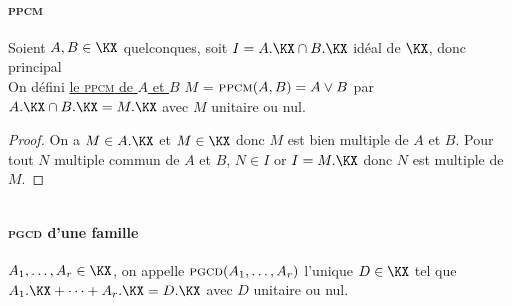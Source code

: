 		\paragraph{\textsc{ppcm}}
			Soient $A,B\in\KX$ quelconques, soit $I=A.\KX \cap B.\KX $ idéal de $\KX$, donc principal \\ 
			On défini \uline{le \textsc{ppcm} de $A$ et $B$} $M$ = $\textsc{ppcm}(A,B)=A\vee B$ par \\
			\hspace*{2cm} $A.\KX \cap B.\KX = M.\KX$ avec $M$ unitaire ou nul. \trait
		\begin{proof}
		On a $M\in A.\KX$ et $M\in\KX$ donc $M$ est bien multiple de $A$ et $B$. Pour tout $N$ multiple commun de $A$ et $B$, $N\in I$ or $I=M.\KX$ donc $N$ est multiple de $M$.
		\end{proof} ${}$ \traitd
		\paragraph{\textsc{pgcd} d'une famille}
			$A_1,\dots ,A_r \in\KX$, on appelle $\textsc{pgcd}(A_1,\dots , A_r)$ l'unique $D\in\KX$ tel que $A_1.\KX + \cdots + A_r.\KX = D.\KX$ avec $D$ unitaire ou nul. \trait ${}$ \vspace*{-0.7cm} \traitd
